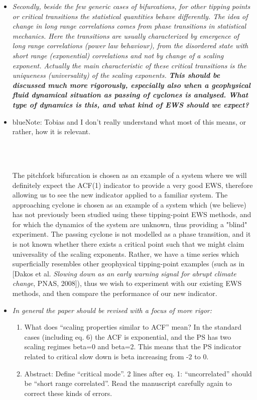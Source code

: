 \documentclass[12pt]{article}
\def\bb{\begin{color}{blue}}
\def\eb{\end{color}\ }
\begin{document}
\begin{itemize}
\item[\bf Comment 3.]
{\sl 
Secondly, beside the few generic cases of bifurcations, for other tipping points or critical transitions the statistical quantities behave differently. The idea of change in long range correlations comes from phase transitions in statistical mechanics. Here the transitions are usually characterized by emergence of long range correlations (power law behaviour), from the disordered state with short range (exponential) correlations and not by change of a scaling exponent. Actually the main characteristic of these critical transitions is the uniqueness (universality) of the scaling exponents. {\bf This should be discussed much more rigorously, especially also when a geophysical fluid dynamical situation as passing of cyclones is analysed. What type of dynamics is this, and what kind of EWS should we expect?}
}

\item[\bf Response 3.]
{\bb Note: Tobias and I don't really understand what most of this means, or rather, how it is relevant. \eb}\\
The pitchfork bifurcation is chosen as an example of a system where we will definitely expect the ACF(1) indicator to provide a very good EWS, therefore allowing us to see the new indicator applied to a familiar system. The approaching cyclone is chosen as an example of a system which (we believe) has not previously been studied using these tipping-point EWS methods, and for which the dynamics of the system are unknown, thus providing a "blind" experiment. The passing cyclone is not modelled as a phase transition, and it is not known whether there exists a critical point such that we might claim universality of the scaling exponents. Rather, we have a time series which superficially resembles other geophysical tipping-point examples (such as in [Dakos et al. {\it Slowing down as an early warning signal for abrupt climate change}, PNAS, 2008]), thus we wish to experiment with our existing EWS methods, and then compare the performance of our new indicator.



\item[\bf Comment 4.] %
{\sl 
In general the paper should be revised with a focus of more rigor:
\begin{enumerate}
\item What does ``scaling properties similar to ACF'' mean? In the standard cases (including eq. 6) the ACF is exponential, and the PS has two scaling regimes beta=0 and beta=2. This means that the PS indicator related to critical slow down is beta increasing from -2 to 0.
\item Abstract: Define ``critical mode''. 2 lines after eq. 1: ``uncorrelated'' should be ``short range correlated''. Read the manuscript carefully again to correct these kinds of errors.
\end{enumerate}
}


\end{itemize}
\end{document}
